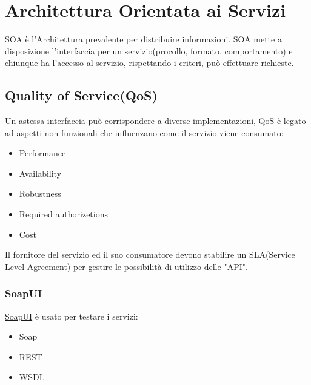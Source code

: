 \section{Architettura Orientata ai Servizi}
SOA è l'Architettura prevalente per distribuire informazioni.
SOA mette a disposizione l'interfaccia per un servizio(procollo, formato, comportamento) e chiunque ha l'accesso al servizio, rispettando i criteri, può effettuare richieste.
\subsection{Quality of Service(QoS)}
Un astessa interfaccia può corrispondere a diverse implementazioni, QoS è legato ad aspetti non-funzionali che influenzano come il servizio viene consumato:
\begin{itemize}
    \item Performance
    \item Availability
    \item Robustness
    \item Required authorizetions
    \item Cost
\end{itemize}

Il fornitore del servizio ed il suo consumatore devono stabilire un SLA(Service Level Agreement) per gestire le possibilità di utilizzo delle "API".

\subsubsection{SoapUI}
\href{https://www.soapui.org/}{SoapUI} è usato per testare i servizi:
\begin{itemize}
    \item Soap
    \item REST
    \item WSDL
\end{itemize}
